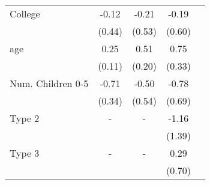 \begin{tabular}{lcccc}
College&-0.12&-0.21&-0.19&\\&(0.44)&(0.53)&(0.60)&\\age&0.25&0.51&0.75&\\&(0.11)&(0.20)&(0.33)&\\Num. Children 0-5&-0.71&-0.50&-0.78&\\&(0.34)&(0.54)&(0.69)&\\Type 2&-&-&-1.16&\\&&&(1.39)&\\Type 3&-&-&0.29&\\&&&(0.70)&\\\bottomrule\end{tabular}